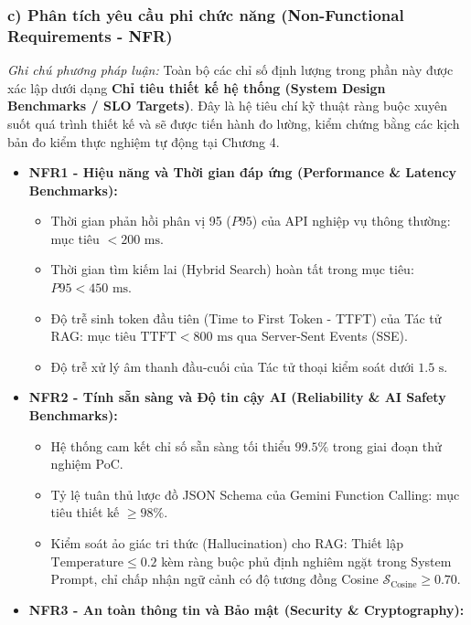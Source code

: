 \documentclass[11pt, a4paper]{report}
\begin{document}
\subsubsection{c) Phân tích yêu cầu phi chức năng (Non-Functional Requirements - NFR)}

\textit{Ghi chú phương pháp luận:} Toàn bộ các chỉ số định lượng trong phần này được xác lập dưới dạng \textbf{Chỉ tiêu thiết kế hệ thống (System Design Benchmarks / SLO Targets)}. Đây là hệ tiêu chí kỹ thuật ràng buộc xuyên suốt quá trình thiết kế và sẽ được tiến hành đo lường, kiểm chứng bằng các kịch bản đo kiểm thực nghiệm tự động tại Chương 4.

\begin{itemize}
    \item \textbf{NFR1 - Hiệu năng và Thời gian đáp ứng (Performance \& Latency Benchmarks):}
    \begin{itemize}
        \item Thời gian phản hồi phân vị 95 ($P95$) của API nghiệp vụ thông thường: mục tiêu $< 200\text{ ms}$.
        \item Thời gian tìm kiếm lai (Hybrid Search) hoàn tất trong mục tiêu: $P95 < 450\text{ ms}$.
        \item Độ trễ sinh token đầu tiên (Time to First Token - TTFT) của Tác tử RAG: mục tiêu $\text{TTFT} < 800\text{ ms}$ qua Server-Sent Events (SSE).
        \item Độ trễ xử lý âm thanh đầu-cuối của Tác tử thoại kiểm soát dưới $1.5\text{ s}$.
    \end{itemize}
    \item \textbf{NFR2 - Tính sẵn sàng và Độ tin cậy AI (Reliability \& AI Safety Benchmarks):}
    \begin{itemize}
        \item Hệ thống cam kết chỉ số sẵn sàng tối thiểu $99.5\%$ trong giai đoạn thử nghiệm PoC.
        \item Tỷ lệ tuân thủ lược đồ JSON Schema của Gemini Function Calling: mục tiêu thiết kế $\ge 98\%$.
        \item Kiểm soát ảo giác tri thức (Hallucination) cho RAG: Thiết lập $\text{Temperature} \le 0.2$ kèm ràng buộc phủ định nghiêm ngặt trong System Prompt, chỉ chấp nhận ngữ cảnh có độ tương đồng Cosine $\mathcal{S}_{\text{Cosine}} \ge 0.70$.
    \end{itemize}
    \item \textbf{NFR3 - An toàn thông tin và Bảo mật (Security \& Cryptography):}
    \begin{itemize}

\end{itemize}
\end{itemize}
\end{document}
